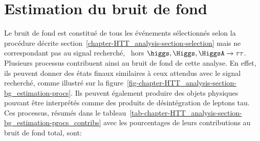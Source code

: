 \section{Estimation du bruit de fond}\label{chapter-HTT_analysis-section-bg_estimation}
Le bruit de fond est constitué de tous les événements sélectionnés selon la procédure décrite section~\ref{chapter-HTT_analysis-section-selection} mais ne correspondant pas au signal recherché, \ie\ hors $\higgs,\Higgs,\HiggsA\to\tau\tau$.
Plusieurs processus contribuent ainsi au bruit de fond de cette analyse.
En effet, ils peuvent donner des états finaux similaires à ceux attendus avec le signal recherché, comme illustré sur la figure~\ref{fig-chapter-HTT_analysis-section-bg_estimation-procs}.
Ils peuvent également produire des objets physiques pouvant être interprétés comme des produits de désintégration de leptons tau.
Ces processus, résumés dans le tableau~\ref{tab-chapter-HTT_analysis-section-bg_estimation-procs_contribs} avec les pourcentages de leurs contributions au bruit de fond total, sont:
